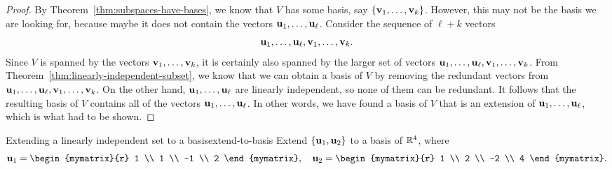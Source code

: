 \begin{proof}
  By Theorem~\ref{thm:subspaces-have-bases}, we know that $V$ has some
  basis, say $\set{\vect{v}_1,\ldots,\vect{v}_k}$. However, this may
  not be the basis we are looking for, because maybe it does not
  contain the vectors $\vect{u}_1,\ldots,\vect{u}_{\ell}$. Consider
  the sequence of $\ell+k$ vectors
  \begin{equation*}
    \vect{u}_1,\ldots,\vect{u}_{\ell},\vect{v}_1,\ldots,\vect{v}_k.
  \end{equation*}
  Since $V$ is spanned by the vectors $\vect{v}_1,\ldots,\vect{v}_k$,
  it is certainly also spanned by the larger set of vectors
  $\vect{u}_1,\ldots,\vect{u}_{\ell},\vect{v}_1,\ldots,\vect{v}_k$.
  From Theorem~\ref{thm:linearly-independent-subset}, we know that we
  can obtain a basis of $V$ by removing the redundant vectors from
  $\vect{u}_1,\ldots,\vect{u}_{\ell},\vect{v}_1,\ldots,\vect{v}_k$. On
  the other hand, $\vect{u}_1,\ldots,\vect{u}_{\ell}$ are linearly
  independent, so none of them can be redundant. It follows that the
  resulting basis of $V$ contains all of the vectors
  $\vect{u}_1,\ldots,\vect{u}_{\ell}$. In other words, we have found a
  basis of $V$ that is an extension of
  $\vect{u}_1,\ldots,\vect{u}_{\ell}$, which is what had to be shown.
\end{proof}

\begin{example}{Extending a linearly independent set to a basis}{extend-to-basis}
  Extend $\set{\vect{u}_1,\vect{u}_2}$ to a basis of $\mathbb{R}^4$, where
  \begin{equation*}
    \vect{u}_1 = \begin{mymatrix}{r} 1 \\ 1 \\ -1 \\ 2 \end{mymatrix},\quad
    \vect{u}_2 = \begin{mymatrix}{r} 1 \\ 2 \\ -2 \\ 4 \end{mymatrix}.
  \end{equation*}
\end{example}

